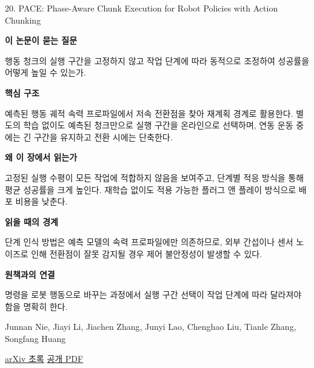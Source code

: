 \documentclass[11pt,openany]{book}
\begin{document}
\begin{termcard}{20. PACE: Phase-Aware Chunk Execution for Robot Policies with Action Chunking}

\par

\medskip

{\sffamily\bfseries\color{deepblue} 이 논문이 묻는 질문}\par

행동 청크의 실행 구간을 고정하지 않고 작업 단계에 따라 동적으로 조정하여 성공률을 어떻게 높일 수 있는가.

\smallskip

{\sffamily\bfseries\color{deepblue} 핵심 구조}\par

예측된 행동 궤적 속력 프로파일에서 저속 전환점을 찾아 재계획 경계로 활용한다. 별도의 학습 없이도 예측된 청크만으로 실행 구간을 온라인으로 선택하며, 연동 운동 중에는 긴 구간을 유지하고 전환 시에는 단축한다.

\smallskip

{\sffamily\bfseries\color{deepblue} 왜 이 장에서 읽는가}\par

고정된 실행 수평이 모든 작업에 적합하지 않음을 보여주고, 단계별 적응 방식을 통해 평균 성공률을 크게 높인다. 재학습 없이도 적용 가능한 플러그 앤 플레이 방식으로 배포 비용을 낮춘다.

\smallskip

{\sffamily\bfseries\color{coral} 읽을 때의 경계}\par

단계 인식 방법은 예측 모델의 속력 프로파일에만 의존하므로, 외부 간섭이나 센서 노이즈로 인해 전환점이 잘못 감지될 경우 제어 불안정성이 발생할 수 있다.

\smallskip

{\sffamily\bfseries\color{teal} 원책과의 연결}\par

명령을 로봇 행동으로 바꾸는 과정에서 실행 구간 선택이 작업 단계에 따라 달라져야 함을 명확히 한다.

\medskip

{\footnotesize\color{muted} Junnan Nie, Jiayi Li, Jiachen Zhang, Junyi Lao, Chenghao Liu, Tianle Zhang, Songfang Huang\par

\href{https://arxiv.org/abs/2606.00537}{arXiv 초록} \quad \href{https://arxiv.org/pdf/2606.00537}{공개 PDF}\par}

\end{termcard}
\end{document}
